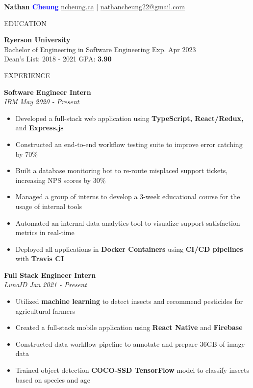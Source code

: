 \documentclass[letterpaper,11pt,oneside]{article}
\newcommand{\createHeading}[1]{
    \vspace{1.25em}
    \hline
    \vspace{-1.5ex}
    \begin{center}
        #1
    \end{center}
    \vspace{-1.5ex}
    \hline
    \vspace{1.25em}
}
\begin{document}

\noindent \huge{\textbf{Nathan \textcolor{blue}{Cheung}}} \hfill \normalsize{\href{https://ncheung.ca}{ncheung.ca} | \href{mailto:nathancheung22@gmail.com}{nathancheung22@gmail.com}}




\createHeading{EDUCATION}
\begin{addmargin}[.6em]{.6em}
    \textbf{Ryerson University} \\
    Bachelor of Engineering in Software Engineering \hfill Exp. Apr 2023 \\
    Dean's List: 2018 - 2021 \hfill GPA: \textbf{3.90}
\end{addmargin}

\createHeading{EXPERIENCE}
\begin{addmargin}[.6em]{.6em}
    \textbf{Software Engineer Intern} \\
    \textit{IBM} \hfill \textit{May 2020 - Present}
    \begin{itemize}
        \item Developed a full-stack web application using \textbf{TypeScript, React/Redux,} and \textbf{Express.js}
        \item Constructed an end-to-end workflow testing suite to improve error catching by 70\%
        \item Built a database monitoring bot to re-route misplaced support tickets, increasing NPS scores by 30\%
        \item Managed a group of interns to develop a 3-week educational course for the usage of internal tools
        \item Automated an internal data analytics tool to visualize support satisfaction metrics in real-time
        \item Deployed all applications in \textbf{Docker Containers} using \textbf{CI/CD pipelines} with \textbf{Travis CI}
    \end{itemize}
    \vspace{1.25em}
    \textbf{Full Stack Engineer Intern} \\
    \textit{LunaID} \hfill \textit{Jan 2021 - Present}
    \begin{itemize}
        \item Utilized \textbf{machine learning} to detect insects and recommend pesticides for agricultural farmers
        \item Created a full-stack mobile application using \textbf{React Native} and \textbf{Firebase}
        \item Constructed data workflow pipeline to annotate and prepare 36GB of image data
        \item Trained object detection \textbf{COCO-SSD TensorFlow} model to classify insects based on species and age
    \end{itemize}
    \vspace{0.5em}
\end{addmargin}
\end{document}
